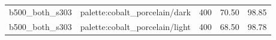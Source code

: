 \begin{longtable}{l>{\raggedright\arraybackslash}p{.42\linewidth}rrr}
b500\_\allowbreak{}both\_\allowbreak{}s303 & %
palette:cobalt\_\allowbreak{}porcelain/dark & %
400 & %
70.50 & %
98.85 \\ %

b500\_\allowbreak{}both\_\allowbreak{}s303 & %
palette:cobalt\_\allowbreak{}porcelain/light & %
400 & %
68.50 & %
98.78 \\ %


\end{longtable}
